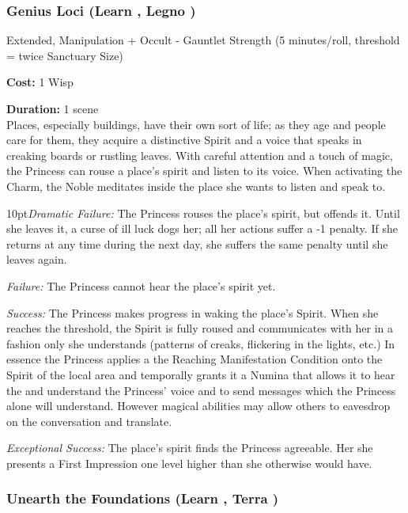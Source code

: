 \subsubsection*{Genius Loci (Learn \textbullet\textbullet\textbullet, Legno \textbullet\textbullet)} 

\noindent Extended, Manipulation + Occult - Gauntlet Strength (5 minutes/roll, threshold = twice Sanctuary Size)

\noindent \textbf{Cost:} 1 Wisp

\noindent \textbf{Duration:} 1 scene \\

\noindent Places, especially buildings, have their own sort of life; as they age and people care for them, they acquire a distinctive Spirit and a voice that speaks in creaking boards or rustling leaves. With careful attention and a touch of magic, the Princess can rouse a place’s spirit and listen to its voice. When activating the Charm, the Noble meditates inside the place she wants to listen and speak to. 

\begin{myindentpar}{10pt}\emph{Dramatic Failure:} The Princess rouses the place’s spirit, but offends it. Until she leaves it, a curse of ill luck dogs her; all her actions suffer a -1 penalty. If she returns at any time during the next day, she suffers the same penalty until she leaves again. 

\emph{Failure:} The Princess cannot hear the place’s spirit yet. 

\emph{Success:} The Princess makes progress in waking the place’s Spirit. When she reaches the threshold, the Spirit is fully roused and communicates with her in a fashion only she
understands (patterns of creaks, flickering in the lights, etc.) In essence the Princess applies a the Reaching Manifestation Condition onto the Spirit of the local area and temporally grants it a Numina that allows it to hear the and understand the Princess' voice and to send messages which the Princess alone will understand. However magical abilities may allow others to eavesdrop on the conversation and translate. 

\emph{Exceptional Success:} The place’s spirit finds the Princess agreeable. Her she presents a First Impression one level higher than she otherwise would have. \end{myindentpar}

\subsubsection*{Unearth the Foundations (Learn \textbullet\textbullet\textbullet, Terra \textbullet)}

